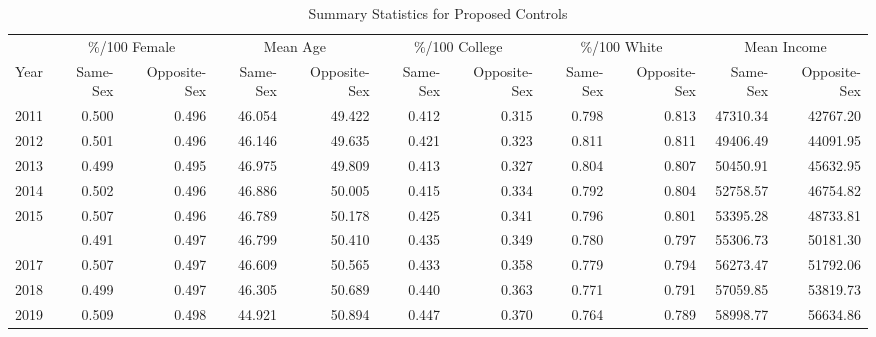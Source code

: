 \begin{table}

\caption{Summary Statistics for Proposed Controls}
\centering
\begin{tabular}[t]{rrrrrrrrrrr}
\toprule
\multicolumn{1}{c}{ } & \multicolumn{2}{c}{\%/100 Female} & \multicolumn{2}{c}{Mean Age} & \multicolumn{2}{c}{\%/100 College} & \multicolumn{2}{c}{\%/100 White} & \multicolumn{2}{c}{Mean Income} \\
\cmidrule(l{3pt}r{3pt}){2-3} \cmidrule(l{3pt}r{3pt}){4-5} \cmidrule(l{3pt}r{3pt}){6-7} \cmidrule(l{3pt}r{3pt}){8-9} \cmidrule(l{3pt}r{3pt}){10-11}
Year & Same-Sex & Opposite-Sex & Same-Sex & Opposite-Sex & Same-Sex & Opposite-Sex & Same-Sex & Opposite-Sex & Same-Sex & Opposite-Sex\\
\midrule
2011 & 0.500 & 0.496 & 46.054 & 49.422 & 0.412 & 0.315 & 0.798 & 0.813 & 47310.34 & 42767.20\\
2012 & 0.501 & 0.496 & 46.146 & 49.635 & 0.421 & 0.323 & 0.811 & 0.811 & 49406.49 & 44091.95\\
2013 & 0.499 & 0.495 & 46.975 & 49.809 & 0.413 & 0.327 & 0.804 & 0.807 & 50450.91 & 45632.95\\
2014 & 0.502 & 0.496 & 46.886 & 50.005 & 0.415 & 0.334 & 0.792 & 0.804 & 52758.57 & 46754.82\\
2015 & 0.507 & 0.496 & 46.789 & 50.178 & 0.425 & 0.341 & 0.796 & 0.801 & 53395.28 & 48733.81\\
\addlinespace
2016 & 0.491 & 0.497 & 46.799 & 50.410 & 0.435 & 0.349 & 0.780 & 0.797 & 55306.73 & 50181.30\\
2017 & 0.507 & 0.497 & 46.609 & 50.565 & 0.433 & 0.358 & 0.779 & 0.794 & 56273.47 & 51792.06\\
2018 & 0.499 & 0.497 & 46.305 & 50.689 & 0.440 & 0.363 & 0.771 & 0.791 & 57059.85 & 53819.73\\
2019 & 0.509 & 0.498 & 44.921 & 50.894 & 0.447 & 0.370 & 0.764 & 0.789 & 58998.77 & 56634.86\\
\bottomrule
\end{tabular}
\end{table}
